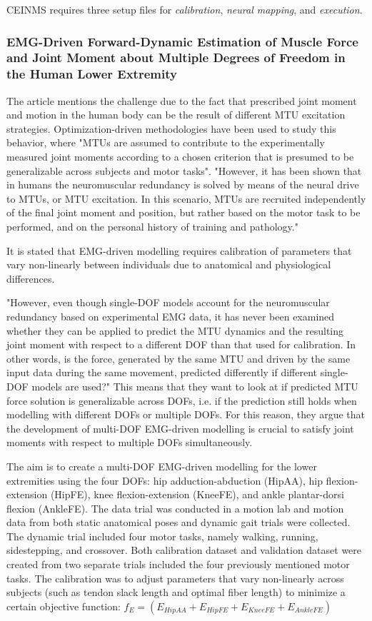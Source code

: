 CEINMS requires three setup files for \textit{calibration}, \textit{neural mapping}, and \textit{execution}.

\subsubsection{EMG-Driven Forward-Dynamic Estimation of Muscle Force and Joint Moment about Multiple Degrees of Freedom in the Human Lower Extremity}

The article mentions the challenge due to the fact that prescribed joint moment and motion in the human body can be the result of different MTU excitation strategies. 
Optimization-driven methodologies have been used to study this behavior, where "MTUs are assumed to contribute to the experimentally measured joint moments according to a chosen criterion that is presumed to be generalizable across subjects and motor tasks". 
"However, it has been shown that in humans the neuromuscular redundancy is solved by means of the neural drive to MTUs, or MTU excitation. In this scenario, MTUs are recruited independently of the final joint moment and position, but rather based on the motor task to be performed, and on the personal history of training and pathology." \cite{Sartori2012a}

It is stated that EMG-driven modelling requires calibration of parameters that vary non-linearly between individuals due to anatomical and physiological differences.

"However, even though single-DOF models account for
the neuromuscular redundancy based on experimental EMG data,
it has never been examined whether they can be applied to predict
the MTU dynamics and the resulting joint moment with respect to
a different DOF than that used for calibration. In other words, is
the force, generated by the same MTU and driven by the same
input data during the same movement, predicted differently if
different single-DOF models are used?" \cite[p. 2]{Sartori2012a}
This means that they want to look at if predicted MTU force solution is generalizable across DOFs, i.e. if the prediction still holds when modelling with different DOFs or multiple DOFs. For this reason, they argue that the development of multi-DOF EMG-driven modelling is crucial to satisfy joint moments with respect to multiple DOFs simultaneously. 

The aim is to create a multi-DOF EMG-driven modelling for the lower extremities using the four DOFs: hip adduction-abduction (HipAA), hip flexion-extension (HipFE), knee flexion-extension (KneeFE), and ankle plantar-dorsi flexion (AnkleFE).
The data trial was conducted in a motion lab and motion data from both static anatomical poses and dynamic gait trials were collected. The dynamic trial included four motor tasks, namely walking, running, sidestepping, and crossover. Both calibration dataset and validation dataset were created from two separate trials included the four previously mentioned motor tasks. The calibration was to adjust parameters that vary non-linearly across subjects (such as tendon slack length and optimal fiber length) to minimize a certain objective function: $f_E = \left( E_{HipAA} + E_{HipFE} + E_{KneeFE} + E_{AnkleFE} \right)$


